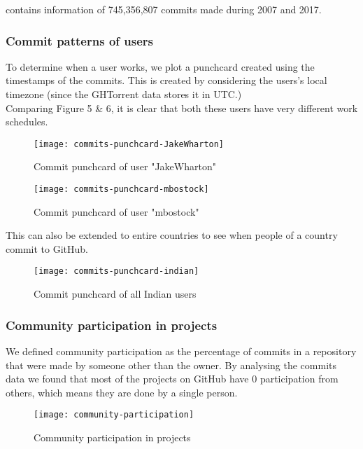  contains information of 745,356,807 commits made during 2007 and 2017.

\subsubsection{Commit patterns of users}

To determine when a user works, we plot a punchcard created using the timestamps of the commits.
This is created by considering the users's local timezone (since the GHTorrent data stores it in UTC.) \\

Comparing Figure 5 \& 6, it is clear that both these users have very different work schedules.

\begin{figure}[htb]
\centering
\texttt{[image: commits-punchcard-JakeWharton]}
\caption{Commit punchcard of user "JakeWharton"}
\end{figure}

\begin{figure}[htb]
\centering
\texttt{[image: commits-punchcard-mbostock]}
\caption{Commit punchcard of user "mbostock"}
\end{figure}

This can also be extended to entire countries to see when people of a country commit to GitHub.

\begin{figure}[htb]
\centering
\texttt{[image: commits-punchcard-indian]}
\caption{Commit punchcard of all Indian users}
\end{figure}

\newpage
\subsubsection{Community participation in projects}

We defined community participation as the percentage of commits in a repository that were made
by someone other than the owner. By analysing the commits data we found that most of the projects
on GitHub have 0 participation from others, which means they are done by a single person.

\vspace{25px}
\begin{figure}[htb]
\centering
\centerline{\texttt{[image: community-participation]}}
\caption{Community participation in projects}
\end{figure}

